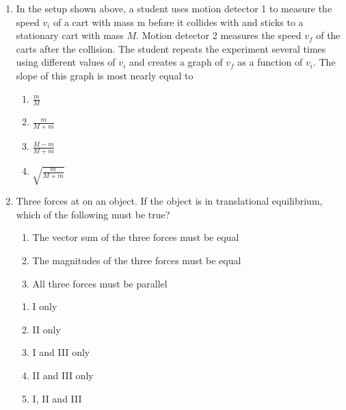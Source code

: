 \documentclass[11pt]{article}
\newcommand{\pic}[2]{\texttt{[image: \#2]}}
\begin{document}
\begin{multicols}{2}
\begin{enumerate}[leftmargin=18pt,resume]
    \begin{center}
      \pic{.48}{car-collision}
    \end{center}
  \item In the setup shown above, a student uses motion detector 1 to measure
    the speed $v_i$ of a cart with mass m before it collides with and sticks to
    a stationary cart with mass $M$. Motion detector 2 measures the speed $v_f$
    of the carts after the collision. The student repeats the experiment
    several times using different values of $v_i$ and creates a graph of $v_f$
    as a function of $v_i$. The slope of this graph is most nearly equal to
    \begin{enumerate}[noitemsep,topsep=0pt,leftmargin=18pt,label=(\Alph*)]
    \item$\displaystyle\frac{m}{M}$
    \item$\displaystyle\frac{m}{M+m}$
    \item$\displaystyle\frac{M-m}{M+m}$
    \item$\displaystyle\sqrt{\frac{m}{M+m}}$
    \end{enumerate}
    \columnbreak
    
  \item Three forces at on an object. If the object is in translational
    equilibrium, which of the following must be true?
    \begin{enumerate}[noitemsep,topsep=0pt,leftmargin=18pt,label={\Roman*.}]
    \item The vector sum of the three forces must be equal
    \item The magnitudes of the three forces must be equal
    \item All three forces must be parallel
    \end{enumerate}
    \begin{enumerate}[noitemsep,topsep=0pt,leftmargin=18pt,label=(\Alph*)]
    \item I only
    \item II only
    \item I and III only
    \item II and III only
    \item I, II and III
    \end{enumerate}
    \vspace{.7in}
    

\end{enumerate}
\end{multicols}
\end{document}
